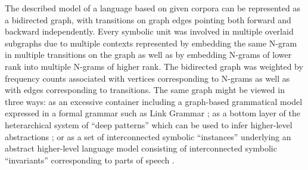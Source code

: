 \documentclass[11pt]{article}
\begin{document}
The described model of a language based on given corpora can be represented as a bidirected graph, with transitions on graph edges pointing both forward and backward independently. Every symbolic unit was involved in multiple overlaid subgraphs due to multiple contexts represented by embedding the same N-gram in multiple transitions on the graph as well as by embedding N-grams of lower rank into multiple N-grams of higher rank. The bidirected graph was weighted by frequency counts associated with vertices corresponding to N-grams as well as with edges corresponding to transitions. The same graph might be viewed in three ways: as an excessive container including a graph-based grammatical model expressed in a formal grammar such as Link Grammar \citep{3,5,6}; as a bottom layer of the heterarchical system of “deep patterns” which can be used to infer higher-level abstractions \citep{4}; or as a set of interconnected symbolic “instances” underlying an abstract higher-level language model consisting of interconnected symbolic “invariants” corresponding to parts of speech \citep{17}.
\end{document}
